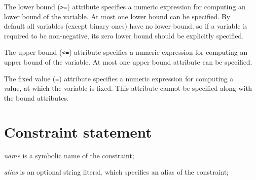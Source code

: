 \documentclass[11pt]{report}
\begin{document}
The lower bound ({\tt>=}) attribute specifies a numeric expression for
computing an lower bound of the variable. At most one lower bound can
be specified. By default all variables (except binary ones) have no
lower bound, so if a variable is required to be non-negative, its zero
lower bound should be explicitly specified.

The upper bound ({\tt<=}) attribute specifies a numeric expression for
computing an upper bound of the variable. At most one upper bound
attribute can be specified.

The fixed value ({\tt=}) attribute specifies a numeric expression for
computing a value, at which the variable is fixed. This attribute
cannot be specified along with the bound attributes.

\section{Constraint statement}

\noindent
{}

\medskip

\noindent
{\it name} is a symbolic name of the constraint;

\noindent
{\it alias} is an optional string literal, which specifies an alias of
the constraint;
\end{document}
